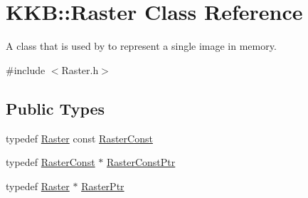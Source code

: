 \hypertarget{class_k_k_b_1_1_raster}{}\section{K\+KB\+:\+:Raster Class Reference}
\label{class_k_k_b_1_1_raster}


A class that is used by to represent a single image in memory.  




{\ttfamily \#include $<$Raster.\+h$>$}

\subsection*{Public Types}
\begin{DoxyCompactItemize}
\item 
typedef \hyperlink{class_k_k_b_1_1_raster}{Raster} const \hyperlink{class_k_k_b_1_1_raster_a938ab844ee73af06f79244750f96d3df}{Raster\+Const}
\item 
typedef \hyperlink{class_k_k_b_1_1_raster_a938ab844ee73af06f79244750f96d3df}{Raster\+Const} $\ast$ \hyperlink{class_k_k_b_1_1_raster_ad76aea7ccc94ebd88384a43aa1a19394}{Raster\+Const\+Ptr}
\item 
typedef \hyperlink{class_k_k_b_1_1_raster}{Raster} $\ast$ \hyperlink{class_k_k_b_1_1_raster_aefa532857fd6aa9eb53f79da55a97c5a}{Raster\+Ptr}
\end{DoxyCompactItemize}

